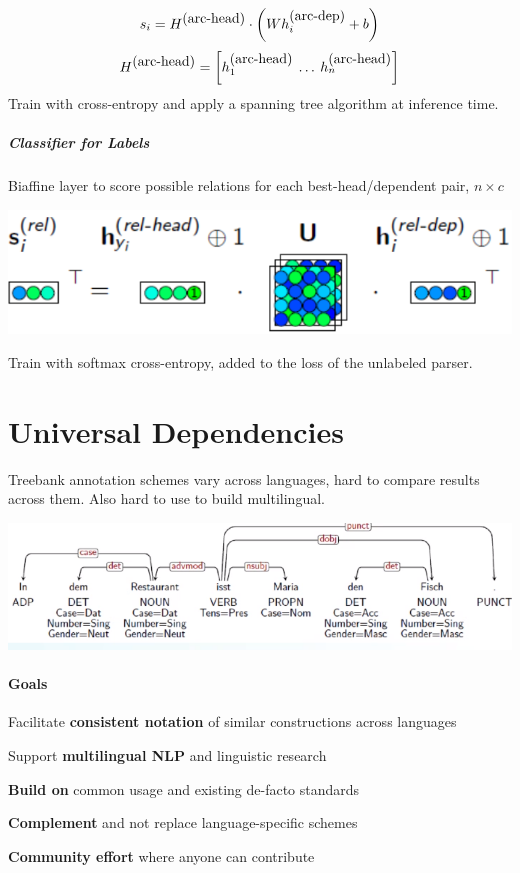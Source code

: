 \documentclass[10pt]{report}
\begin{document}
$$s_i = H^{\hbox{(arc-head)}}\cdot\left(Wh_i^{\hbox{(arc-dep)}}+b\right)$$
$$H^{\hbox{(arc-head)}} = \left[h_1^{\hbox{(arc-head)}}\:\ldots\:h_n^{\hbox{(arc-head)}}\right]$$
Train with cross-entropy and apply a spanning tree algorithm at inference time.
\subparagraph{Classifier for Labels} Biaffine layer to score possible relations for each best-head/dependent pair, $n\times c$
\begin{center}
	\includegraphics[scale=0.5]{48.png}
\end{center}
Train with softmax cross-entropy, added to the loss of the unlabeled parser.
\section{Universal Dependencies}
Treebank annotation schemes vary across languages, hard to compare results across them. Also hard to use to build multilingual.
\begin{center}
	\includegraphics[scale=0.5]{39.png}
\end{center}
\paragraph{Goals} \begin{list}{}{}
	\item Facilitate \textbf{consistent notation} of similar constructions across languages
	\item Support \textbf{multilingual NLP} and linguistic research
	\item \textbf{Build on} common usage and existing de-facto standards
	\item \textbf{Complement} and not replace language-specific schemes
	\item \textbf{Community effort} where anyone can contribute 
\end{list}
\end{document}
